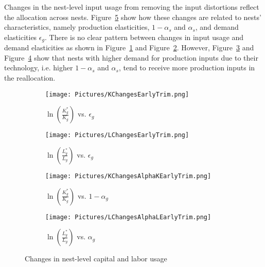 \documentclass[12pt]{article}
\begin{document}

Changes in the nest-level input usage from removing the input distortions reflect the allocation across nests. Figure~\ref{fig:KLChanges} show how these changes are related to nests' characteristics, namely production elasticities, $1-\alpha_s$ and $\alpha_s$, and demand elasticities $\epsilon_g$. There is no clear pattern between changes in input usage and demand elasticities as shown in Figure~\ref{Figure:KChanges} and Figure~\ref{Figure:LChanges}. However, Figure~\ref{Figure:KChangesAlphaK} and Figure~\ref{Figure:LChangesAlphaL} show that nests with higher demand for production inputs due to their technology, i.e. higher $1-\alpha_s$ and $\alpha_s$, tend to receive more production inputs in the reallocation.

\begin{figure}[htbp!]
\centering
\begin{subfigure}{.5\textwidth}
  \centering
\caption{$\ln\left(\frac{K_g^*}{K_g}\right)$ vs. $\epsilon_g$}
\label{Figure:KChanges}
\texttt{[image: Pictures/KChangesEarlyTrim.png]}
\end{subfigure}%
\begin{subfigure}{.5\textwidth}
  \centering
\caption{$\ln\left(\frac{L_g^*}{L_g}\right)$ vs. $\epsilon_g$}
\label{Figure:LChanges}
\texttt{[image: Pictures/LChangesEarlyTrim.png]}
\end{subfigure}
\begin{subfigure}{.5\textwidth}
  \centering
\caption{$\ln\left(\frac{K_g^*}{K_g}\right)$ vs. $1-\alpha_g$}
\label{Figure:KChangesAlphaK}
\texttt{[image: Pictures/KChangesAlphaKEarlyTrim.png]}
\end{subfigure}%
\begin{subfigure}{.5\textwidth}
  \centering
\caption{$\ln\left(\frac{L_g^*}{L_g}\right)$ vs. $\alpha_g$}
\label{Figure:LChangesAlphaL}
\texttt{[image: Pictures/LChangesAlphaLEarlyTrim.png]}
\end{subfigure}
\caption{Changes in nest-level capital and labor usage}
\label{fig:KLChanges}
\end{figure}
\end{document}

